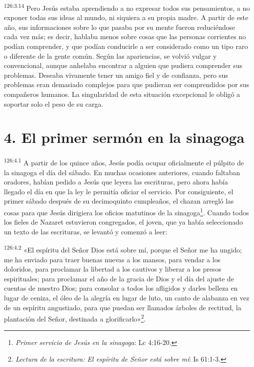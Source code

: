 \par
\textsuperscript{126:3.14} Pero Jesús estaba aprendiendo a no expresar todos sus pensamientos, a no exponer todas sus ideas al mundo, ni siquiera a su propia madre. A partir de este año, sus informaciones sobre lo que pasaba por su mente fueron reduciéndose cada vez más; es decir, hablaba menos sobre cosas que las personas corrientes no podían comprender, y que podían conducirle a ser considerado como un tipo raro o diferente de la gente común. Según las apariencias, se volvió vulgar y convencional, aunque anhelaba encontrar a alguien que pudiera comprender sus problemas. Deseaba vivamente tener un amigo fiel y de confianza, pero sus problemas eran demasiado complejos para que pudieran ser comprendidos por sus compañeros humanos. La singularidad de esta situación excepcional le obligó a soportar solo el peso de su carga.

\section*{4. El primer sermón en la sinagoga}
\par
\textsuperscript{126:4.1} A partir de los quince años, Jesús podía ocupar oficialmente el púlpito de la sinagoga el día del sábado. En muchas ocasiones anteriores, cuando faltaban oradores, habían pedido a Jesús que leyera las escrituras, pero ahora había llegado el día en que la ley le permitía oficiar el servicio. Por consiguiente, el primer sábado después de su decimoquinto cumpleaños, el chazan arregló las cosas para que Jesús dirigiera los oficios matutinos de la sinagoga\footnote{\textit{Primer servicio de Jesús en la sinagoga}: Lc 4:16-20.}. Cuando todos los fieles de Nazaret estuvieron congregados, el joven, que ya había seleccionado un texto de las escrituras, se levantó y comenzó a leer:

\par
\textsuperscript{126:4.2} «El espíritu del Señor Dios está sobre mí, porque el Señor me ha ungido; me ha enviado para traer buenas nuevas a los mansos, para vendar a los doloridos, para proclamar la libertad a los cautivos y liberar a los presos espirituales; para proclamar el año de la gracia de Dios y el día del ajuste de cuentas de nuestro Dios; para consolar a todos los afligidos y darles belleza en lugar de ceniza, el óleo de la alegría en lugar de luto, un canto de alabanza en vez de un espíritu angustiado, para que puedan ser llamados árboles de rectitud, la plantación del Señor, destinada a glorificarlo»\footnote{\textit{Lectura de la escritura: El espíritu de Señor está sobre mí}: Is 61:1-3.}.


